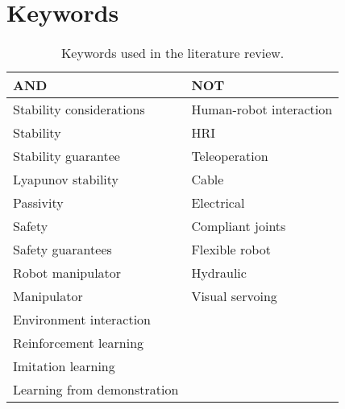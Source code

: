 \chapter{Keywords}
\label{chapter:keywords}

\setlength\extrarowheight{4pt}
\begin{table}[htb]
    \centering
    \caption{Keywords used in the literature review.}
    \label{tab:keywords}
    \begin{tabularx}{0.8\textwidth}{XX}
        \toprule
        AND & NOT \\
        \midrule
        Stability considerations & Human-robot interaction \\
        Stability & HRI \\
        Stability guarantee & Teleoperation \\
        Lyapunov stability & Cable \\
        Passivity & Electrical \\
        Safety & Compliant joints \\
        Safety guarantees & Flexible robot \\
        Robot manipulator & Hydraulic \\
        Manipulator & Visual servoing \\
        Environment interaction &  \\
        Reinforcement learning & \\
        Imitation learning & \\
        Learning from demonstration & \\
        \bottomrule
    \end{tabularx}
\end{table}
